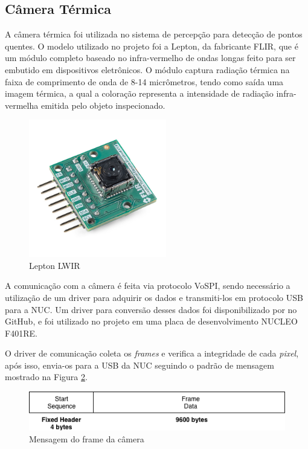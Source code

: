 	\subsection{Câmera Térmica}
	
		A câmera térmica foi utilizada no sistema de percepção para detecção de pontos quentes. O modelo utilizado no projeto foi a Lepton, da fabricante FLIR, que é um módulo completo baseado no infra-vermelho de ondas longas feito para ser embutido em dispositivos eletrônicos. O módulo captura radiação térmica na faixa de comprimento de onda de 8-14 micrômetros, tendo como saída uma imagem térmica, a qual a coloração representa a intensidade de radiação infra-vermelha emitida pelo objeto inspecionado.
		
		\begin{figure}[!ht]
		   \centering
		   \includegraphics[width=6cm]{Figures/lepton_flir.jpg}
		   \caption{Lepton LWIR}
		   \label{fig:lepton}
		\end{figure}
		
		 A comunicação com a câmera é feita via protocolo VoSPI, sendo necessário a utilização de um driver para adquirir os dados e transmiti-los em protocolo USB para a NUC. Um driver para conversão desses dados foi disponibilizado por  no GitHub, e foi utilizado no projeto em uma placa de desenvolvimento NUCLEO F401RE.
		
		
		O driver de comunicação coleta os \textit{frames} e verifica a integridade de cada \textit{pixel}, após isso, envia-os para a USB da NUC seguindo o padrão de mensagem mostrado na Figura \ref{fig:framemsg}.
		    
		\begin{figure}[!ht]
		   \centering
		   \includegraphics[width=14cm]{Figures/frame_msg.png}
		   \caption{Mensagem do frame da câmera}
		   \label{fig:framemsg}
		\end{figure}
	
